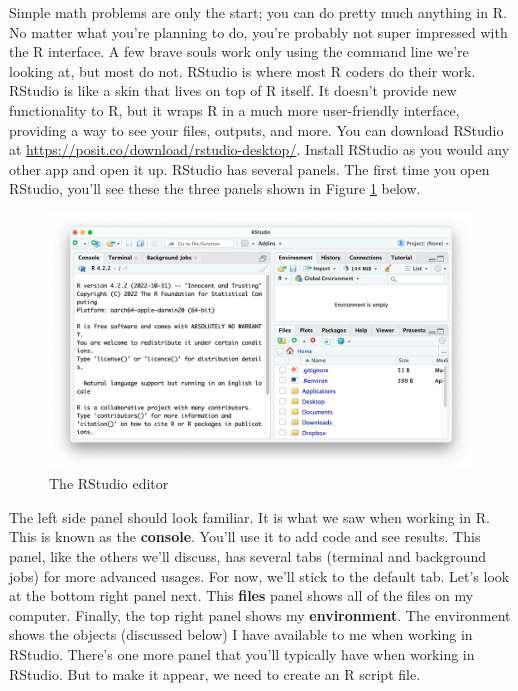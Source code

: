 \documentclass[
]{book}
\begin{document}
Simple math problems are only the start; you can do pretty much anything in R. No matter what you're planning to do, you're probably not super impressed with the R interface. A few brave souls work only using the command line we're looking at, but most do not. RStudio is where most R coders do their work. RStudio is like a skin that lives on top of R itself. It doesn't provide new functionality to R, but it wraps R in a much more user-friendly interface, providing a way to see your files, outputs, and more. You can download RStudio at \url{https://posit.co/download/rstudio-desktop/}. Install RStudio as you would any other app and open it up. RStudio has several panels. The first time you open RStudio, you'll see these the three panels shown in Figure \ref{fig:rstudio-no-project} below.

\begin{figure}
\includegraphics[width=1\linewidth]{assets/rstudio-no-project} \caption{The RStudio editor}\label{fig:rstudio-no-project}
\end{figure}

The left side panel should look familiar. It is what we saw when working in R. This is known as the \textbf{console}. You'll use it to add code and see results. This panel, like the others we'll discuss, has several tabs (terminal and background jobs) for more advanced usages. For now, we'll stick to the default tab. Let's look at the bottom right panel next. This \textbf{files} panel shows all of the files on my computer. Finally, the top right panel shows my \textbf{environment}. The environment shows the objects (discussed below) I have available to me when working in RStudio. There's one more panel that you'll typically have when working in RStudio. But to make it appear, we need to create an R script file.
\end{document}
